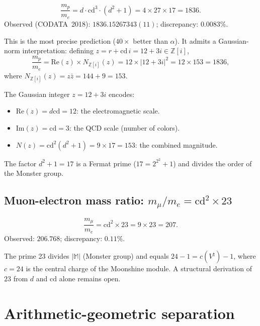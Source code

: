 \documentclass[aps,prl,twocolumn,superscriptaddress,nofootinbib]{revtex4-2}
\newcommand{\cd}{\mathrm{cd}}
\newcommand{\Z}{\mathbb{Z}}
\begin{document}
\begin{equation}
  \frac{m_p}{m_e} = d \cdot \cd^3 \cdot (d^2 + 1)
  = 4 \times 27 \times 17 = 1836.
  \label{eq:mass}
\end{equation}
Observed (CODATA~2018): $1836.15267343(11)$;
discrepancy: $0.0083\%$.

This is the most precise prediction ($40\times$ better than $\alpha$).
It admits a Gaussian-norm interpretation:
defining $z = r + \cd\,i = 12 + 3i \in \Z[i]$,
\begin{equation}
  \frac{m_p}{m_e} = \mathrm{Re}(z) \times N_{\Z[i]}(z)
  = 12 \times |12+3i|^2 = 12 \times 153 = 1836,
  \label{eq:gauss}
\end{equation}
where $N_{\Z[i]}(z) = z\bar{z} = 144 + 9 = 153$.

The Gaussian integer $z = 12 + 3i$ encodes:
\begin{itemize}
\item $\mathrm{Re}(z) = d\cd = 12$: the electromagnetic scale.
\item $\mathrm{Im}(z) = \cd = 3$: the QCD scale (number of colors).
\item $N(z) = \cd^2(d^2+1) = 9 \times 17 = 153$: the combined magnitude.
\end{itemize}

The factor $d^2 + 1 = 17$ is a Fermat prime
($17 = 2^{2^2} + 1$) and divides the order of the
Monster group.

\subsection{Muon-electron mass ratio: $m_\mu/m_e = \cd^2 \times 23$}

\begin{equation}
  \frac{m_\mu}{m_e} = \cd^2 \times 23 = 9 \times 23 = 207.
  \label{eq:muon}
\end{equation}
Observed: $206.768$; discrepancy: $0.11\%$.

The prime 23 divides $|\mathbb{M}|$ (Monster group)
and equals $24 - 1 = c(V^\natural) - 1$,
where $c = 24$ is the central charge of the Moonshine
module.  A structural derivation of $23$ from $d$ and $\cd$
alone remains open.

\section{Arithmetic-geometric separation}
\end{document}
